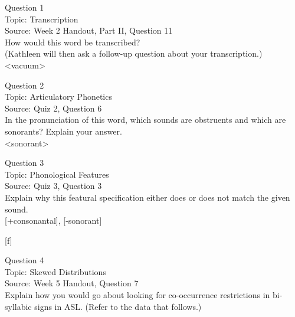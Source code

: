 \documentclass[12pt]{article}
\begin{document}
{\large Question 1}\\

Topic: Transcription\\
Source: Week 2 Handout, Part II, Question 11\\

How would this word be transcribed?\\ (Kathleen will then ask a follow-up question about your transcription.)\\

<vacuum>


\newpage

{\large Question 2}\\

Topic: Articulatory Phonetics\\
Source: Quiz 2, Question 6\\

In the pronunciation of this word, which sounds are obstruents and which are sonorants? Explain your answer.\\

<sonorant>


\newpage

{\large Question 3}\\

Topic: Phonological Features\\
Source: Quiz 3, Question 3\\

Explain why this featural specification either does or does not match the given sound.\\

{[+consonantal]}, {[-sonorant]}

{[f]}


\newpage

{\large Question 4}\\

Topic: Skewed Distributions\\
Source: Week 5 Handout, Question 7\\

Explain how you would go about looking for co-occurrence restrictions in bi-syllabic signs in ASL. (Refer to the data that follows.)\\
\end{document}
